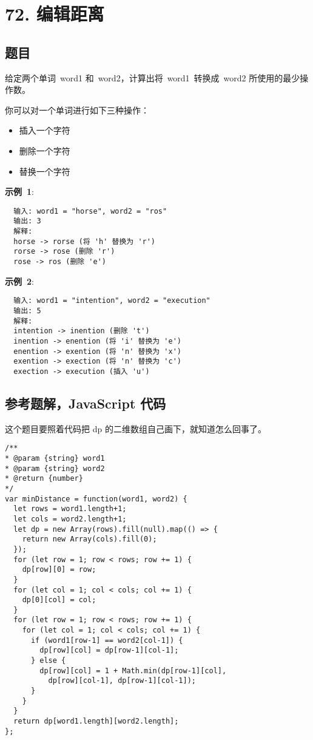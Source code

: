 \newpage
\section{72. 编辑距离}
\label{leetcode:72}

\subsection{题目}

给定两个单词 word1 和 word2，计算出将 word1 转换成 word2 所使用的最少操作数。

你可以对一个单词进行如下三种操作：

\begin{itemize}
  \item 插入一个字符
  \item 删除一个字符
  \item 替换一个字符
\end{itemize}

\textbf{示例 1}:

\begin{verbatim}
  输入: word1 = "horse", word2 = "ros"
  输出: 3
  解释:
  horse -> rorse (将 'h' 替换为 'r')
  rorse -> rose (删除 'r')
  rose -> ros (删除 'e')
\end{verbatim}

\textbf{示例 2}:

\begin{verbatim}
  输入: word1 = "intention", word2 = "execution"
  输出: 5
  解释:
  intention -> inention (删除 't')
  inention -> enention (将 'i' 替换为 'e')
  enention -> exention (将 'n' 替换为 'x')
  exention -> exection (将 'n' 替换为 'c')
  exection -> execution (插入 'u')
\end{verbatim}

\subsection{参考题解，JavaScript 代码}

这个题目要照着代码把 dp 的二维数组自己画下，就知道怎么回事了。

\begin{verbatim}
/**
* @param {string} word1
* @param {string} word2
* @return {number}
*/
var minDistance = function(word1, word2) {
  let rows = word1.length+1;
  let cols = word2.length+1;
  let dp = new Array(rows).fill(null).map(() => {
    return new Array(cols).fill(0);
  });
  for (let row = 1; row < rows; row += 1) {
    dp[row][0] = row;
  }
  for (let col = 1; col < cols; col += 1) {
    dp[0][col] = col;
  }
  for (let row = 1; row < rows; row += 1) {
    for (let col = 1; col < cols; col += 1) {
      if (word1[row-1] == word2[col-1]) {
        dp[row][col] = dp[row-1][col-1];
      } else {
        dp[row][col] = 1 + Math.min(dp[row-1][col],
          dp[row][col-1], dp[row-1][col-1]);
      }
    }
  }
  return dp[word1.length][word2.length];
};
\end{verbatim}

